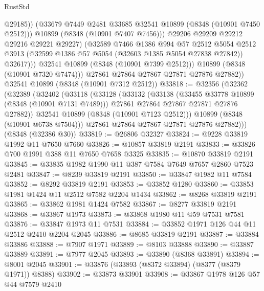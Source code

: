 \begin{lexlean}{RustStd}
\begin{coremodule}
                        @29185))
                    (@33679 @7449 @2481 @33685 @32541 @10899 (@8348 (@10901 @7450 @2512)))
                    @10899
                    (@8348 (@10901 @7407 @7456)))
                  @29206
                  @29209
                  @29212
                  @29216
                  @29221
                  @29227)
                (@32589
                  @7466
                  @1386
                  @994
                  @57
                  @2512
                  @5054
                  @2512
                  @3913
                  (@32599 @1386 @57 @5054 (@32603 @1385 @5054 @27838 @27842))
                  @32617)))
            @32541
            @10899
            (@8348 (@10901 @7399 @2512)))
          @10899
          (@8348 (@10901 @7320 @7474)))
        @27861
        @27864
        @27867
        @27871
        @27876
        @27882))
    @32541
    @10899
    (@8348 (@10901 @7312 @2512))
@33818 := @32356
    (@32362
      (@32389
        (@32402
          (@33118
            (@33128
              (@33132
                (@33138
                  (@33455 @33778 @10899 (@8348 (@10901 @7131 @7489)))
                  @27861
                  @27864
                  @27867
                  @27871
                  @27876
                  @27882))
              @32541
              @10899
              (@8348 (@10901 @7123 @2512)))
            @10899
            (@8348 (@10901 @6738 @7504)))
          @27861
          @27864
          @27867
          @27871
          @27876
          @27882)))
    (@8348 (@32386 @30))
@33819 := @26806 @32327
@33824 := @9228 @33819 @1992 @11 @7650 @7660
@33826 := @10857 @33819 @2191
@33833 := @33826 @700 @1991 @388 @11 @7650 @7658 @3325
@33835 := @10870 @33819 @2191
@33845 := @33835 @1982 @1990 @11 @387 @7584 @7649 @7657 @2860 @7523 @2481
@33847 := @8239 @33819 @2191
@33850 := @33847 @1982 @11 @7584
@33852 := @8292 @33819 @2191
@33853 := @33852 @1280
@33860 := @33853 @1981 @1424 @11 @2512 @7582 @2204 @1434
@33862 := @8268 @33819 @2191
@33865 := @33862 @1981 @1424 @7582
@33867 := @8277 @33819 @2191
@33868 := @33867 @1973
@33873 := @33868 @1980 @11 @59 @7531 @7581
@33876 := @33847 @1973 @11 @7531
@33884 := @33852 @1971 @126 @44 @11 @2512 @2410 @2204 @2045
@33886 := @8685 @33819 @2191
@33887 := @33884 @33886
@33888 := @7907 @1971
@33889 := @8103 @33888
@33890 := @33887 @33889
@33891 := @7977 @2045
@33893 := @33890 (@8368 @33891)
@33894 := @8001 @2045
@33901 := @33876 (@33893 (@8372 @33894) (@8377 (@8379 @1971)) @8388)
@33902 := @33873 @33901
@33908 := @33867 @1978 @126 @57 @44 @7579 @2410

\end{coremodule}
\end{lexlean}
